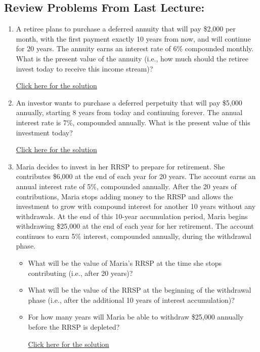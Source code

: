 \documentclass[
]{book}
\providecommand{\tightlist}{%
  \setlength{\itemsep}{0pt}\setlength{\parskip}{0pt}}
\begin{document}
\subsection*{Review Problems From Last Lecture:}\label{review-problems-from-last-lecture-16}

\begin{enumerate}
\def\labelenumi{\arabic{enumi}.}
\tightlist
\item
  A retiree plans to purchase a deferred annuity that will pay \$2,000 per month, with the first payment exactly 10 years from now, and will continue for 20 years. The annuity earns an interest rate of 6\% compounded monthly. What is the present value of the annuity (i.e., how much should the retiree invest today to receive this income stream)?

  \href{https://youtu.be/HVz-VL22-JI}{Click here for the solution}
\item
  An investor wants to purchase a deferred perpetuity that will pay \$5,000 annually, starting 8 years from today and continuing forever. The annual interest rate is 7\%, compounded annually. What is the present value of this investment today?

  \href{https://youtu.be/FHhqwkhFg9A}{Click here for the solution}
\item
  Maria decides to invest in her RRSP to prepare for retirement. She contributes \$6,000 at the end of each year for 20 years. The account earns an annual interest rate of 5\%, compounded annually. After the 20 years of contributions, Maria stops adding money to the RRSP and allows the investment to grow with compound interest for another 10 years without any withdrawals. At the end of this 10-year accumulation period, Maria begins withdrawing \$25,000 at the end of each year for her retirement. The account continues to earn 5\% interest, compounded annually, during the withdrawal phase.

  \begin{itemize}
  \tightlist
  \item
    What will be the value of Maria's RRSP at the time she stops contributing (i.e., after 20 years)?
  \item
    What will be the value of the RRSP at the beginning of the withdrawal phase (i.e., after the additional 10 years of interest accumulation)?
  \item
    For how many years will Maria be able to withdraw \$25,000 annually before the RRSP is depleted?

    \href{https://youtu.be/fwglKbNsHZ4}{Click here for the solution}
  \end{itemize}
\end{enumerate}
\end{document}
